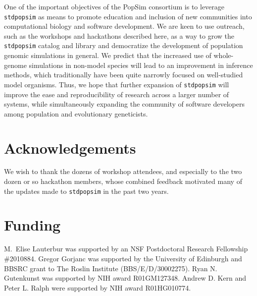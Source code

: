 \documentclass[hidelinks]{article}
\newcommand{\stdpopsim}{\texttt{stdpopsim}\xspace}
\begin{document}
One of the important objectives of the PopSim consortium is to leverage \stdpopsim as means to promote education and inclusion of new communities into
computational biology and software development.
We are keen to use outreach, such as the workshops and hackathons described here, 
as a way to grow the \stdpopsim catalog and library and
democratize the development of population genomic simulations in general.
We predict that the increased use of whole-genome simulations in non-model species will lead to an improvement in inference methods,
which traditionally have been quite narrowly focused on well-studied model organisms.
Thus, we hope that further expansion of \stdpopsim will improve the ease and reproducibility of research across a larger number of systems,
while simultaneously expanding the community of software developers among population and evolutionary geneticists.


\section*{Acknowledgements}\label{acknowledgements}

We wish to thank the dozens of workshop attendees,
and especially to the two dozen or so hackathon members,
whose combined feedback motivated many of the updates made to \stdpopsim in the past two years.

\section*{Funding}
    \label{funding}

M.~Elise Lauterbur was supported by an NSF Postdoctoral Research Fellowship \#2010884.
Gregor Gorjanc was supported by the University of Edinburgh and BBSRC grant to The Roslin Institute (BBS/E/D/30002275).
Ryan N. Gutenkunst was supported by NIH award R01GM127348.
Andrew D. Kern and Peter L. Ralph were supported by NIH award R01HG010774.


\end{document}
